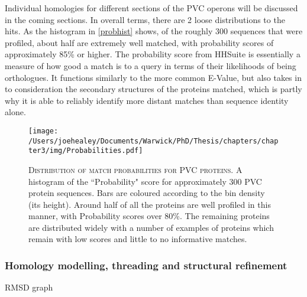 Individual homologies for different sections of the PVC operons will be discussed in the coming sections. In overall terms, there are 2 loose distributions to the hits. As the histogram in \vref{probhist} shows, of the roughly 300 sequences that were profiled, about half are extremely well matched, with probability scores of approximately 85\% or higher. The probability score from HHSuite is essentially a measure of how good a match is to a query in terms of their likelihoods of being orthologues. It functions similarly to the more common E-Value, but also takes in to consideration the secondary structures of the proteins matched, which is partly why it is able to reliably identify more distant matches than sequence identity alone.

\begin{figure}[h]
\texttt{[image: /Users/joehealey/Documents/Warwick/PhD/Thesis/chapters/chapter3/img/Probabilities.pdf]}
	\captionsetup{singlelinecheck=off, justification=justified, font=footnotesize, aboveskip=10pt}
	\caption[HHPred orthologue match scores]{\textsc{\normalsize Distribution of match probabilities for PVC proteins.}\vspace{0.1cm} \newline A histogram of the ``Probability" score for approximately 300 PVC protein sequences. Bars are coloured according to the bin density (its height). Around half of all the proteins are well profiled in this manner, with Probability scores over 80\%. The remaining proteins are distributed widely with a number of examples of proteins which remain with low scores and little to no informative matches.}
	\label{probhist}
\end{figure}


\subsubsection{Homology modelling, threading and structural refinement}

RMSD graph

